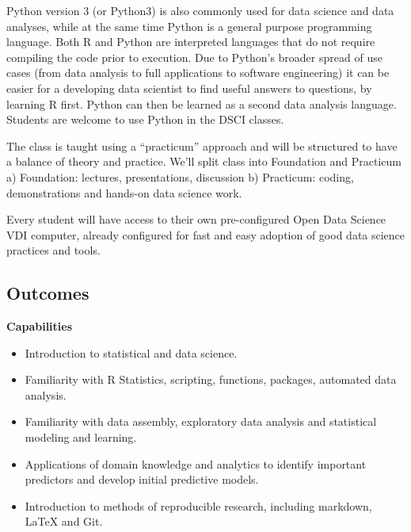\documentclass[10pt]{article} %
\begin{document}
  Python version 3 (or Python3) is also commonly used for data science and data analyses, while at the same time Python is a general purpose programming language.
  Both R and Python are interpreted languages that do not require compiling the code prior to execution.
  Due to Python's broader spread of use cases (from data analysis to full applications to software engineering) it can be easier for a developing data scientist to find useful answers to questions, by learning R first.
  Python can then be learned as a second data analysis language.
  Students are welcome to use Python in the DSCI classes.

  The class is taught using a ``practicum'' approach and will be structured to have a balance of theory and practice.
  We'll split class into Foundation and Practicum
  	a) Foundation: lectures, presentations, discussion
  	b) Practicum: coding, demonstrations and hands-on data science work.

  Every student will have access to their own pre-configured Open Data Science VDI computer, already configured for fast and easy adoption of good data science practices and tools.

  \subsection{Outcomes}

{\bf Capabilities}
\begin{itemize}
  \item Introduction to statistical and data science.
  \item Familiarity with R Statistics, scripting, functions, packages, automated data analysis.
  \item Familiarity with data assembly, exploratory data analysis and statistical modeling and learning.
  \item Applications of domain knowledge and analytics to identify important predictors and develop initial predictive models.
  \item Introduction to methods of reproducible research, including markdown, LaTeX and Git.
\end{itemize}
\end{document}
